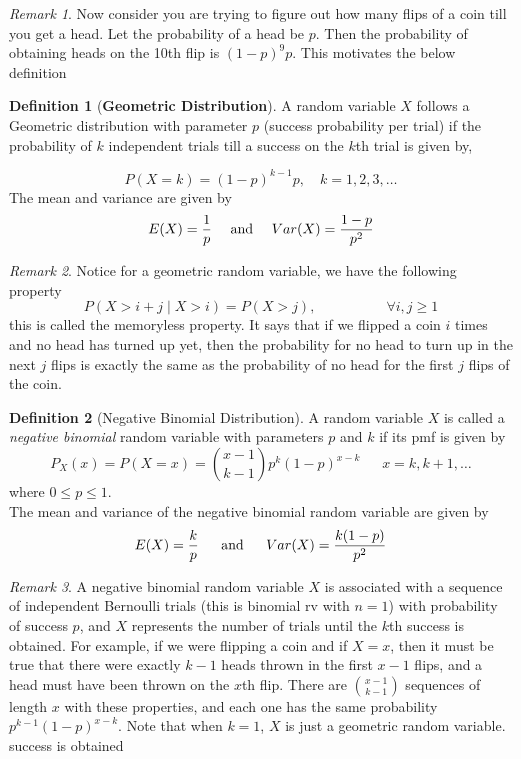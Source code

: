 \documentclass{article}
\theoremstyle{definition}
\newtheorem{definition}{Definition}[section]
\theoremstyle{remark}
\newtheorem{remark}{Remark}[section]
\begin{document}
\vspace{.5cm}



\begin{remark}
Now consider you are trying to figure out how many flips of a coin 
till you get a head. Let the probability of a head be $p$. Then the probability 
of obtaining heads on the 10th flip is $(1-p)^{9}p$. This motivates the below definition
\end{remark}

\begin{definition}[\textbf{Geometric Distribution}]
A random variable \( X \) follows a Geometric distribution with parameter \( p \) (success probability per trial) if the probability of $k$ independent trials till a success on the $k$th trial is given by,

\[
P(X = k) = (1 - p)^{k-1} p, \quad k = 1, 2, 3, \dots
\]
The mean and variance are given by
\[
E(X) = \frac{1}{p} \quad \textnormal{ and } \quad Var(X) = \frac{1-p}{p^2}
\]
\end{definition}

\begin{remark}
Notice for a geometric random variable, we have the following property \[
P(X > i+j \mid X > i) = P(X > j), \quad \quad \quad \quad \quad \forall i,j \geq 1
\]
this is called the memoryless property. It says that if we flipped a coin $i$ 
times and no head has turned up yet, then the probability for no head to turn up in the next $j$ flips is exactly 
the same as the probability of no head for the first $j$ flips of the coin.
\end{remark}




\vspace{.5cm}



\begin{definition}[Negative Binomial Distribution]
A random variable $X$ is called a \textit{negative binomial} random variable
with parameters $p$ and $k$ if its pmf is given by 
\[
P_X(x) = P(X = x) = \binom{x-1}{k-1} p^k (1-p)^{x-k} \; \quad \; x = k, k+1, \dots
\]
where $0 \leq p \leq 1$. \\
The mean and variance of the negative binomial random variable are given by 
\[
E(X) = \frac{k}{p} \quad \; \textnormal{ and } \; \quad Var(X) = \frac{k(1-p)}{p^2}
\]
\end{definition}
\begin{remark}
A negative binomial random variable $X$ is associated with a sequence 
of independent Bernoulli trials (this is binomial rv with $n=1$) with probability of success $p$, 
and $X$ represents the number of trials until the $k$th success is obtained. For example, 
if we were flipping a coin and if $X=x$, then it must be true that there were exactly $k-1$
heads thrown in the first $x-1$ flips, and a head must have been thrown on the $x$th flip.
There are $\binom{x-1}{k-1}$ sequences of length $x$ with these properties, and 
each one has the same probability $p^{k-1} (1-p)^{x-k}$. Note that when $k=1$, $X$ is just
a geometric random variable.  
success is obtained 
\end{remark}
\end{document}
